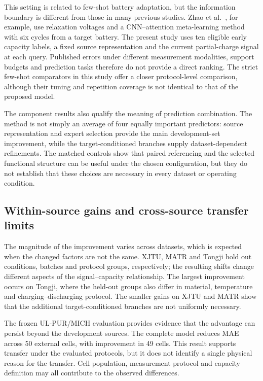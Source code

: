 \documentclass[preprint,12pt]{elsarticle}
\begin{document}
This setting is related to few-shot battery adaptation, but the information boundary is different from those in many previous studies. Zhao et al.\ \citep{zhao2025}, for example, use relaxation voltages and a CNN--attention meta-learning method with six cycles from a target battery. The present study uses ten eligible early capacity labels, a fixed source representation and the current partial-charge signal at each query. Published errors under different measurement modalities, support budgets and prediction tasks therefore do not provide a direct ranking. The strict few-shot comparators in this study offer a closer protocol-level comparison, although their tuning and repetition coverage is not identical to that of the proposed model.

The component results also qualify the meaning of prediction combination. The method is not simply an average of four equally important predictors: source representation and expert selection provide the main development-set improvement, while the target-conditioned branches supply dataset-dependent refinements. The matched controls show that paired referencing and the selected functional structure can be useful under the chosen configuration, but they do not establish that these choices are necessary in every dataset or operating condition.

\subsection{Within-source gains and cross-source transfer limits}
The magnitude of the improvement varies across datasets, which is expected when the changed factors are not the same. XJTU, MATR and Tongji hold out conditions, batches and protocol groups, respectively; the resulting shifts change different aspects of the signal--capacity relationship. The largest improvement occurs on Tongji, where the held-out groups also differ in material, temperature and charging--discharging protocol. The smaller gains on XJTU and MATR show that the additional target-conditioned branches are not uniformly necessary.

The frozen UL-PUR/MICH evaluation provides evidence that the advantage can persist beyond the development sources. The complete model reduces MAE across 50 external cells, with improvement in 49 cells. This result supports transfer under the evaluated protocols, but it does not identify a single physical reason for the transfer. Cell population, measurement protocol and capacity definition may all contribute to the observed differences.
\end{document}
